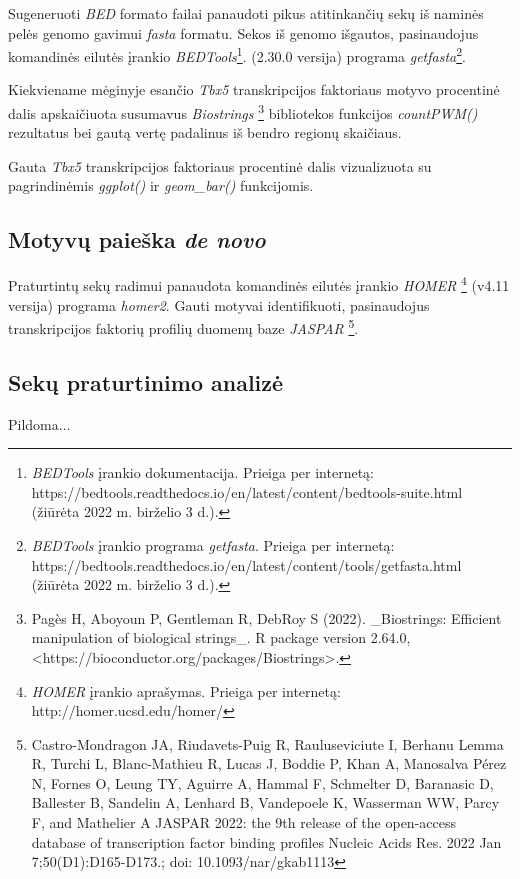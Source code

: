 \documentclass[12pt]{article}
\begin{document}
Sugeneruoti \emph{BED} formato failai panaudoti pikus atitinkančių
sekų iš naminės pelės genomo gavimui \emph{fasta} formatu.
Sekos iš genomo išgautos, pasinaudojus komandinės eilutės įrankio
\emph{BEDTools}\footnote{\emph{BEDTools} įrankio dokumentacija.
Prieiga per internetą:\\ 
https://bedtools.readthedocs.io/en/latest/content/bedtools-suite.html
(žiūrėta 2022 m. birželio 3 d.).}.
(2.30.0 versija) programa \emph{getfasta}\footnote{\emph{BEDTools}
įrankio programa \emph{getfasta}. Prieiga per internetą:\\
https://bedtools.readthedocs.io/en/latest/content/tools/getfasta.html
(žiūrėta 2022 m. birželio 3 d.).}.

Kiekviename mėginyje esančio \emph{Tbx5} transkripcijos faktoriaus
motyvo procentinė dalis apskaičiuota susumavus \emph{Biostrings}
\footnote{Pagès H, Aboyoun P, Gentleman R, DebRoy S (2022). \_Biostrings:
Efficient manipulation of biological strings\_. R package version
2.64.0, <https://bioconductor.org/packages/Biostrings>.}
bibliotekos funkcijos \emph{countPWM()} rezultatus bei gautą
vertę padalinus iš bendro regionų skaičiaus.

Gauta \emph{Tbx5} transkripcijos faktoriaus procentinė dalis
vizualizuota su pagrindinėmis \emph{ggplot()} ir \emph{geom\_bar()}
funkcijomis.

\subsection{Motyvų paieška \emph{de novo}}
Praturtintų sekų radimui panaudota komandinės eilutės įrankio
\emph{HOMER} \footnote{\emph{HOMER} įrankio aprašymas.
Prieiga per internetą:\\ http://homer.ucsd.edu/homer/}
(v4.11 versija) programa \emph{homer2}. Gauti
motyvai identifikuoti, pasinaudojus transkripcijos faktorių
profilių duomenų baze \emph{JASPAR}
\footnote{Castro-Mondragon JA, Riudavets-Puig R, Rauluseviciute I,
Berhanu Lemma R, Turchi L, Blanc-Mathieu R, Lucas J, Boddie P, Khan A,
Manosalva Pérez N, Fornes O, Leung TY, Aguirre A, Hammal F, Schmelter D,
Baranasic D, Ballester B, Sandelin A, Lenhard B, Vandepoele K,
Wasserman WW, Parcy F, and Mathelier A JASPAR 2022: the 9th release of
the open-access database of transcription factor binding profiles Nucleic
Acids Res. 2022 Jan 7;50(D1):D165-D173.; doi: 10.1093/nar/gkab1113}.

\subsection{Sekų praturtinimo analizė}
Pildoma...
\end{document}
